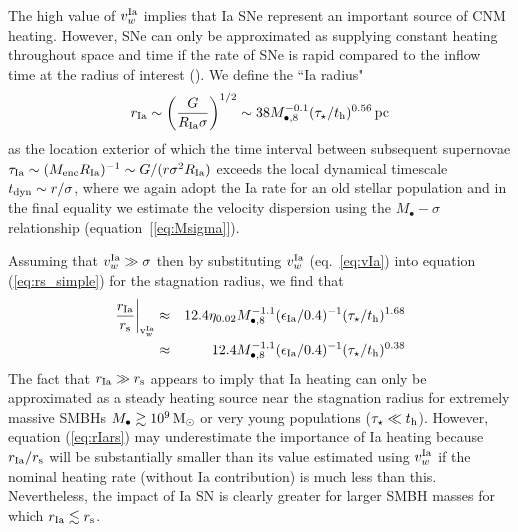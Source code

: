\documentclass[usenatbib,fleqn]{mn2e}
\begin{document}
The high value of $v_{w}^{\rm Ia}$ implies that Ia SNe represent an important source of CNM heating.  However, SNe can only be approximated as supplying constant heating throughout space and time if the rate of SNe is rapid compared to the inflow time at the radius of interest (\citealt{ShcherbakovWong+:2014a}).  We define the ``Ia radius"
  \begin{align}
    r_{\rm Ia} \sim \left(\frac{G}{R_{\rm Ia}\sigma}\right)^{1/2} \sim
    38 M_{\bullet,8}^{-0.1}(\tau_{\star}/t_{\rm h})^{0.56}\,{\rm pc}
    \label{eq:rIa}
  \end{align}
as the location exterior of which the time interval between subsequent supernovae $\tau_{\rm Ia} \sim (M_{\rm enc}R_{\rm Ia})^{-1} \sim G/(r\sigma^{2}R_{\rm Ia})$ exceeds the local dynamical timescale $t_{\rm
dyn} \sim r/\sigma$, where we again adopt the Ia rate for an old stellar population and in the final equality we estimate the velocity dispersion using the $M_{\bullet}-\sigma$ relationship
(equation~[\ref{eq:Msigma}]).  

Assuming that $v_{w}^{\rm Ia} \gg \sigma$ then by substituting $v_{w}^{\rm Ia}$ (eq.~\ref{eq:vIa}) into equation (\ref{eq:rs_simple}) for the stagnation radius, we find that
\begin{eqnarray}
\left.\frac{r_{\rm Ia}}{r_{\rm s}}\right|_{\rm v_{w}^{\rm Ia}} &\approx& 12.4\eta_{0.02} M_{\bullet,8}^{-1.1}(\epsilon_{\rm Ia}/0.4)^{-1}(\tau_{\star}/t_{\rm h})^{1.68} \nonumber \\
&\approx& 12.4M_{\bullet,8}^{-1.1}(\epsilon_{\rm Ia}/0.4)^{-1}(\tau_{\star}/t_{\rm h})^{0.38}
\label{eq:rIars}
\end{eqnarray}
The fact that $r_{\rm Ia} \gg r_{\rm s}$ appears to imply that Ia heating can only be approximated as a steady heating source near the stagnation radius for extremely massive SMBHs $M_{\bullet} \gtrsim 10^9 \,{\rm M_\odot}$ or very young populations ($\tau_{\star} \ll t_{\rm h}$).  However, equation (\ref{eq:rIars}) may underestimate the importance of Ia heating because $r_{\rm Ia}/r_{\rm s}$ will be substantially smaller than its value estimated using $v_{w}^{\rm Ia}$ if the nominal heating rate (without Ia contribution) is much less than this.  Nevertheless, the impact of Ia SN is clearly greater for larger SMBH masses for which $r_{\rm Ia} \lesssim r_{\rm s}$.
\end{document}
